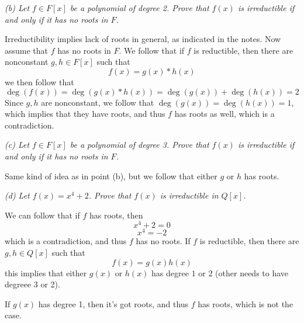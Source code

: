 \documentclass[11pt,oneside,titlepage]{book}
\begin{document}
\textit{(b) Let $f \in F[x]$ be a polynomial of degree 2. Prove that
  $f(x)$ is irreductible if and only if it has no roots in $F$.}

Irreductibility implies lack of roots in general, as indicated in the
notes. Now assume that $f$ has no roots in $F$. We follow that if $f$
is reductible, then there are nonconstant $g, h \in F[x]$
such that
$$f(x) = g(x) * h(x)$$
we then follow that
$$\deg(f(x)) = \deg(g(x) * h(x)) = \deg(g(x)) + \deg(h(x)) = 2$$
Since $g, h$ are nonconstant, we follow that $\deg(g(x)) = \deg(h(x))
= 1$, which implies that they have roots, and thus $f$ has roots as
well, which is a contradiction.

\textit{(c) Let $f \in F[x]$ be a polynomial of degree 3. Prove that
  $f(x)$ is irreductible if and only if it has no roots in $F$.}

Same kind of idea as in point (b), but we follow that either $g$
or $h$ has roots.

\textit{(d) Let $f(x) = x^4 + 2$. Prove that $f(x)$ is irreductible in
  $Q[x]$.}

We can follow that if $f$ has roots, then
$$x^4 + 2 = 0$$
$$x^4 = -2$$
which is a contradiction, and thus $f$ has no roots. If $f$ is
reductible, then there are $g, h \in Q[x]$
such that
$$f(x) = g(x) h(x)$$
this implies that either $g(x)$ or $h(x)$ has degree $1$ or $2$ (other needs to
have degreee 3 or 2).

If $g(x)$ has degree 1, then it's got roots, and thus $f$ has roots,
which is not the case.
\end{document}
